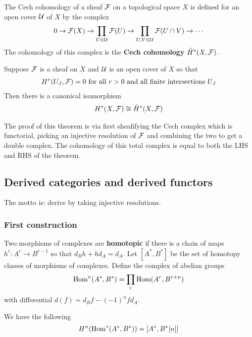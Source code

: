 \documentclass[12pt]{article}
\begin{document}
\begin{definition}
    The Cech cohomology of a sheaf ${\mathcal{F}}$ on a topological space $X$ is defined for 
    an open cover ${\mathcal{U}}$ of $X$ by the complex \begin{align*}
        0 \to {\mathcal{F}}(X) \to \prod_{U\in {\mathcal{U}}} {\mathcal{F}}(U) \to \prod_{U,V\in {\mathcal{U}}} {\mathcal{F}}(U\cap V) \to \cdots
    \end{align*} The cohomology of this complex is the \textbf{Cech cohomology} $\hat H^*(X,{\mathcal{F}})$.
\end{definition}

\begin{theorem}
    Suppose ${\mathcal{F}}$ is a sheaf on $X$ and ${\mathcal{U}}$ is an open cover of $X$ so that \begin{align*}
        H^r(U_J,{\mathcal{F}}) = 0 \text{ for all $r>0$ and all finite intersections $U_J$}
    \end{align*} Then there is a canonical isomorphism
    \begin{align*}
        H^*(X,{\mathcal{F}}) \cong \hat H^*(X,{\mathcal{F}})
    \end{align*}
\end{theorem}

The proof of this theorem is via first sheafifying the Cech complex which is functorial, picking an injective resolution
of ${\mathcal{F}}$ and combining the two to get a double complex. The cohomology of this total complex is equal to 
both the LHS and RHS of the theorem.

\subsection{Derived categories and derived functors}
The motto is: derive by taking injective resolutions.
\subsubsection{First construction}
\begin{definition}
    Two morphisms of complexes are \textbf{homotopic} if there is a chain of maps
    $h^r:A^r\to B^{r-1}$ so that $d_Bh + hd_A = d_A$. Let $[A^*,B^*]$ be the set of homotopy classes
    of morphisms of complexes.
     Define the complex of abelian groups \begin{align}
        \operatorname{Hom}^n(A^*,B^*) = \prod_r \operatorname{Hom}(A^r,B^{r+n})
    \end{align} with differential $d(f) = d_Bf - (-1)^nf d_A$. 
\end{definition}
We have the following \begin{align*}
    H^n(\operatorname{Hom}^*(A^*,B^*)) = [A^*,B^*[n]]
\end{align*}
\end{document}
